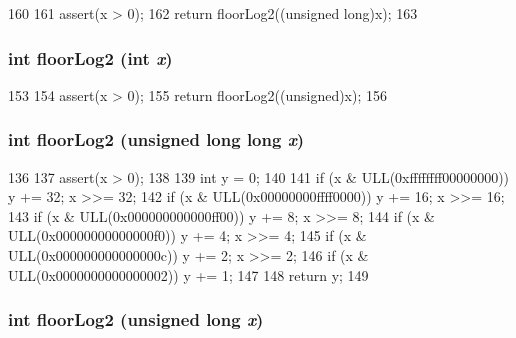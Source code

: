 \begin{DoxyCode}
160 {
161     assert(x > 0);
162     return floorLog2((unsigned long)x);
163 }
\end{DoxyCode}
\hypertarget{intmath_8hh_abd19f55c0889d4497e80d04c592a5a3f}{
\subsubsection[{floorLog2}]{\setlength{\rightskip}{0pt plus 5cm}int floorLog2 (int {\em x})}}
\label{intmath_8hh_abd19f55c0889d4497e80d04c592a5a3f}



\begin{DoxyCode}
153 {
154     assert(x > 0);
155     return floorLog2((unsigned)x);
156 }
\end{DoxyCode}
\hypertarget{intmath_8hh_a1aef59a86a50b9a145dde96ae65c21b7}{
\subsubsection[{floorLog2}]{\setlength{\rightskip}{0pt plus 5cm}int floorLog2 (unsigned long long {\em x})}}
\label{intmath_8hh_a1aef59a86a50b9a145dde96ae65c21b7}



\begin{DoxyCode}
136 {
137     assert(x > 0);
138 
139     int y = 0;
140 
141     if (x & ULL(0xffffffff00000000)) { y += 32; x >>= 32; }
142     if (x & ULL(0x00000000ffff0000)) { y += 16; x >>= 16; }
143     if (x & ULL(0x000000000000ff00)) { y +=  8; x >>=  8; }
144     if (x & ULL(0x00000000000000f0)) { y +=  4; x >>=  4; }
145     if (x & ULL(0x000000000000000c)) { y +=  2; x >>=  2; }
146     if (x & ULL(0x0000000000000002)) { y +=  1; }
147 
148     return y;
149 }
\end{DoxyCode}
\hypertarget{intmath_8hh_a9796f3c77e4ea692eff841b1b0ffd3c5}{
\subsubsection[{floorLog2}]{\setlength{\rightskip}{0pt plus 5cm}int floorLog2 (unsigned long {\em x})}}
\label{intmath_8hh_a9796f3c77e4ea692eff841b1b0ffd3c5}



